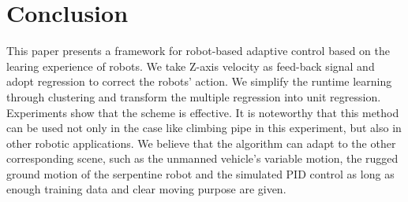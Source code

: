 \section{Conclusion}
This paper presents a framework for robot-based adaptive control based on the learing experience of robots. We take Z-axis velocity as feed-back signal and adopt regression to correct the robots' action. We simplify the runtime learning through clustering and transform the multiple regression into unit regression. Experiments show that the scheme is effective. It is noteworthy that this method can be used not only in the case like climbing pipe in this experiment, but also in other robotic applications. We believe that the algorithm can adapt to the other corresponding scene, such as the unmanned vehicle's variable motion, the rugged ground motion of the serpentine robot and the simulated PID control as long as enough training data and clear moving purpose are given.
